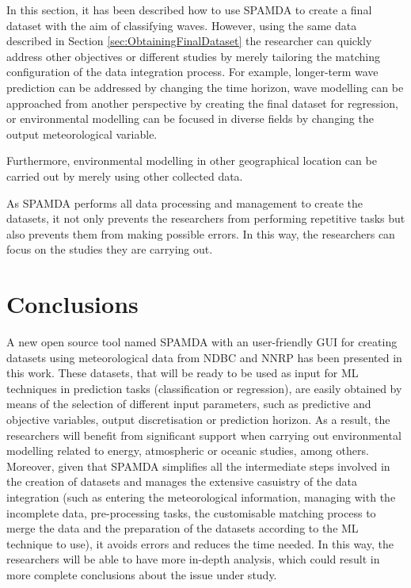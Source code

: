 \documentclass[energies,article,submit,moreauthors,pdftex]{Definitions/mdpi}
\begin{document}
			In this section, it has been described how to use SPAMDA to create a final dataset with the aim of classifying waves. However, using the same data described in Section \ref{sec:ObtainingFinalDataset} the researcher can quickly address other objectives or different studies by merely tailoring the matching configuration of the data integration process. For example, longer-term wave prediction can be addressed by changing the time horizon, wave modelling can be approached from another perspective by creating the final dataset for regression, or environmental modelling can be focused in diverse fields by changing the output meteorological variable.

			Furthermore, environmental modelling in other geographical location can be carried out by merely using other collected data.
			
			As SPAMDA performs all data processing and management to create the datasets, it not only prevents the researchers from performing repetitive tasks but also prevents them from making possible errors. In this way, the researchers can focus on the studies they are carrying out.
		
	\section{Conclusions}\label{sec:Conclusions}

		A new open source tool named SPAMDA with an user-friendly GUI for creating datasets using meteorological data from NDBC and NNRP has been presented in this work. These datasets, that will be ready to be used as input for ML techniques in prediction tasks (classification or regression), are easily obtained by means of the selection of different input parameters, such as predictive and objective variables, output discretisation or prediction horizon. As a result, the researchers will benefit from significant support when carrying out environmental modelling related to energy, atmospheric or oceanic studies, among others. Moreover, given that SPAMDA simplifies all the intermediate steps involved in the creation of datasets and manages the extensive casuistry of the data integration (such as entering the meteorological information, managing with the incomplete data, pre-processing tasks, the customisable matching process to merge the data and the preparation of the datasets according to the ML technique to use), it avoids errors and reduces the time needed. In this way, the researchers will be able to have more in-depth analysis, which could result in more complete conclusions about the issue under study.
\end{document}

